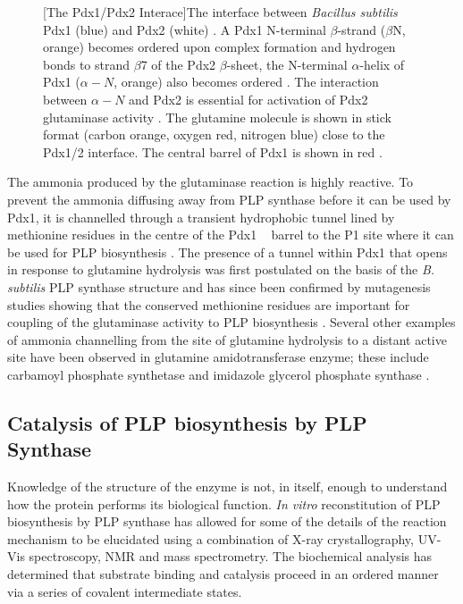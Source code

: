 \begin{figure}[!htbp]
\begin{minipage}{\linewidth}

	[The Pdx1/Pdx2 Interace]{The interface between \textit{Bacillus subtilis} Pdx1 (blue) and Pdx2 (white) \cite{Strohmeier2006}. A Pdx1 N-terminal $\beta$-strand ($\beta$N, orange) becomes ordered upon complex formation and hydrogen bonds to strand $\beta$7 of the Pdx2 $\beta$-sheet, the N-terminal $\alpha$-helix of Pdx1 ($\alpha-N$, orange) also becomes ordered \cite{Strohmeier2006}. The interaction between $\alpha-N$ and Pdx2 is essential for activation of Pdx2 glutaminase activity \cite{Wallner2009}. The glutamine molecule is shown in stick format (carbon orange, oxygen red, nitrogen blue) close to the Pdx1/2 interface. The central barrel of Pdx1 is shown in red \cite{Strohmeier2006,Guedez2012}. \linebreak \label{fig:Pdx1_2Interface}}	
\end{minipage} 
\end{figure}
		
The ammonia produced by the glutaminase reaction is highly reactive. To prevent the ammonia diffusing away from PLP synthase before it can be used by Pdx1, it is channelled through a transient hydrophobic tunnel lined by methionine residues in the centre of the Pdx1 \TIM~ barrel to the P1 site where it can be used for PLP biosynthesis \cite{Guedez2012}. The presence of a tunnel within Pdx1 that opens in response to glutamine hydrolysis was first postulated on the basis of the \textit{B. subtilis} PLP synthase structure and has since been confirmed by mutagenesis studies showing that the conserved methionine residues are important for coupling of the glutaminase activity to PLP biosynthesis \cite{Strohmeier2006,Tambasco-Studart2007,Guedez2012}. Several other examples of ammonia channelling from the site of glutamine hydrolysis to a distant active site have been observed in glutamine amidotransferase enzyme; these include carbamoyl phosphate synthetase and imidazole glycerol phosphate synthase \cite{Thoden1997,Douangamath2002,Raushel2003}. 

	\subsection{Catalysis of PLP biosynthesis by PLP Synthase}	
Knowledge of the structure of the enzyme is not, in itself, enough to understand how the protein performs its biological function. \textit{In vitro} reconstitution of PLP biosynthesis by PLP synthase has allowed for some of the details of the reaction mechanism to be elucidated using a combination of X-ray crystallography, UV-Vis spectroscopy, NMR and mass spectrometry. The biochemical analysis has determined that substrate binding and catalysis proceed in an ordered manner via a series of covalent intermediate states.  
 
